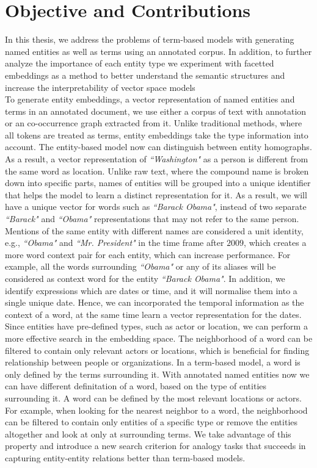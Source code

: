 \section{Objective and Contributions}
In this thesis, we address the problems of term-based models with generating named entities as well as terms using an annotated corpus. In addition, to further analyze the importance of each entity type we experiment with facetted embeddings as a method to better understand the semantic structures and increase the interpretability of vector space models\\
To generate entity embeddings, a vector representation of named entities and terms in an annotated document, we use either a corpus of text with annotation or an co-occurrence graph extracted from it. Unlike traditional methods, where all tokens are treated as terms, entity embeddings take the type information into account. The entity-based model now can distinguish between entity homographs. As a result, a vector representation of \emph{``Washington"} as a person is different from the same word as location. Unlike raw text, where the compound name is broken down into specific parts, names of entities will be grouped into a unique identifier that helps the model to learn a distinct representation for it. As a result, we will have a unique vector for words such as  \emph{``Barack Obama"}, instead of two separate \emph{``Barack"} and \emph{``Obama"} representations that may not refer to the same person. Mentions of the same entity with different names are considered a unit identity, e.g., \emph{``Obama"} and \emph{``Mr. President"} in the time frame after $2009$, which creates a more word context pair for each entity, which can increase performance. For example, all the words surrounding \emph{``Obama"} or any of its aliases will be considered as context word for the entity \emph{``Barack Obama"}. In addition, we identify expressions which are dates or time, and it will normalise them into a single unique date. Hence, we can incorporated the temporal information as the context of a word, at the same time learn a vector representation for the dates. Since entities have pre-defined types, such as actor or location, we can perform a more effective search in the embedding space. The neighborhood of a word can be filtered to contain only relevant actors or locations, which is beneficial for finding relationship between people or organizations. In a term-based model, a word is only defined by the terms surrounding it. With annotated named entities now we can have different definitation of a word, based on the type of entities surrounding it. A word can be defined by the most relevant locations or actors. For example, when looking for the nearest neighbor to a word, the neighborhood can be filtered to contain only entities of a specific type or remove the entities altogether and look at only at surrounding terms. We take advantage of this property and introduce a new search criterion for analogy tasks that succeeds in capturing entity-entity relations better than term-based models. \\
